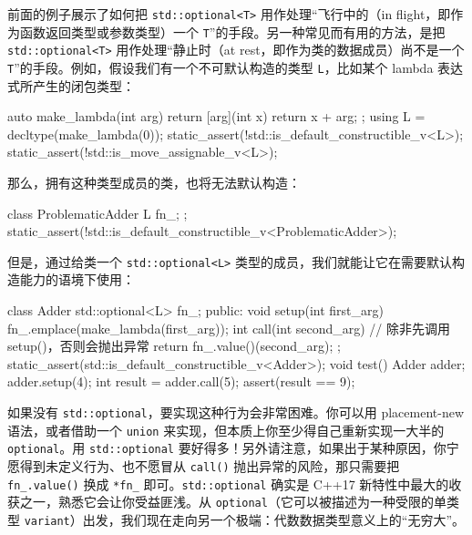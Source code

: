 前面的例子展示了如何把 \texttt{std::\allowbreak{}optional<\allowbreak{}T>\allowbreak{}} 用作处理“飞行中的（in flight，即作为函数返回类型或参数类型）一个 \texttt{T}”的手段。另一种常见而有用的方法，是把 \texttt{std::\allowbreak{}optional<\allowbreak{}T>\allowbreak{}} 用作处理“静止时（at rest，即作为类的数据成员）尚不是一个 \texttt{T}”的手段。例如，假设我们有一个不可默认构造的类型 \texttt{L}，比如某个 lambda 表达式所产生的闭包类型：

\begin{codebox}[cpp]
    auto make_lambda(int arg) {
      return [arg](int x) { return x + arg; };
    }
    using L = decltype(make_lambda(0));
    static_assert(!std::is_default_constructible_v<L>);
    static_assert(!std::is_move_assignable_v<L>);
\end{codebox}

那么，拥有这种类型成员的类，也将无法默认构造：

\begin{codebox}[cpp]
    class ProblematicAdder {
      L fn_;
    };
    static_assert(!std::is_default_constructible_v<ProblematicAdder>);
\end{codebox}

但是，通过给类一个 \texttt{std::\allowbreak{}optional<\allowbreak{}L>\allowbreak{}} 类型的成员，我们就能让它在需要默认构造能力的语境下使用：

\begin{codebox}[cpp]
    class Adder {
      std::optional<L> fn_;
      public:
      void setup(int first_arg) {
        fn_.emplace(make_lambda(first_arg));
      }
      int call(int second_arg) {
        // 除非先调用 setup()，否则会抛出异常
        return fn_.value()(second_arg);
      }
    };
    static_assert(std::is_default_constructible_v<Adder>);
    void test() {
      Adder adder;
      adder.setup(4);
      int result = adder.call(5);
      assert(result == 9);
    }
\end{codebox}

如果没有 \texttt{std::\allowbreak{}optional}，要实现这种行为会非常困难。你可以用 placement-new 语法，或者借助一个 \texttt{union} 来实现，但本质上你至少得自己重新实现一大半的 \texttt{optional}。用 \texttt{std::\allowbreak{}optional} 要好得多！另外请注意，如果出于某种原因，你宁愿得到未定义行为、也不愿冒从 \texttt{call(\allowbreak{})\allowbreak{}} 抛出异常的风险，那只需要把 \texttt{fn\_\allowbreak{}.value(\allowbreak{})\allowbreak{}} 换成 \texttt{*fn\_\allowbreak{}} 即可。\texttt{std::\allowbreak{}optional} 确实是 C++17 新特性中最大的收获之一，熟悉它会让你受益匪浅。从 \texttt{optional}（它可以被描述为一种受限的单类型 \texttt{variant}）出发，我们现在走向另一个极端：代数数据类型意义上的“无穷大”。

